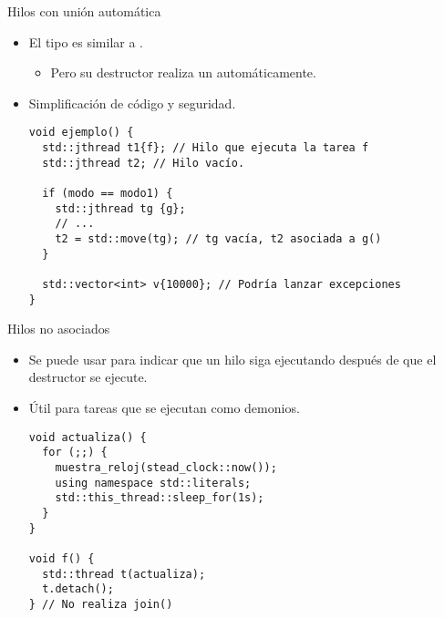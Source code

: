 \begin{frame}[t,fragile]{Hilos con unión automática}
\begin{itemize}
  \item El tipo  es similar a .
    \begin{itemize}
      \item Pero su destructor realiza un  automáticamente.
    \end{itemize}

  \item Simplificación de código y seguridad.
\begin{lstlisting}
void ejemplo() {
  std::jthread t1{f}; // Hilo que ejecuta la tarea f
  std::jthread t2; // Hilo vacío.

  if (modo == modo1) {
    std::jthread tg {g}; 
    // ...
    t2 = std::move(tg); // tg vacía, t2 asociada a g()
  }

  std::vector<int> v{10000}; // Podría lanzar excepciones
}
\end{lstlisting}
\end{itemize}
\end{frame}

\begin{frame}[t,fragile]{Hilos no asociados}
\begin{itemize}
  \item Se puede usar  para indicar que un hilo siga ejecutando 
        después de que el destructor se ejecute.
  \item Útil para tareas que se ejecutan como demonios.
\begin{lstlisting}
void actualiza() {
  for (;;) {
    muestra_reloj(stead_clock::now());
    using namespace std::literals;
    std::this_thread::sleep_for(1s);
  }
}

void f() {
  std::thread t(actualiza);
  t.detach();
} // No realiza join()
\end{lstlisting}
\end{itemize}
\end{frame}

